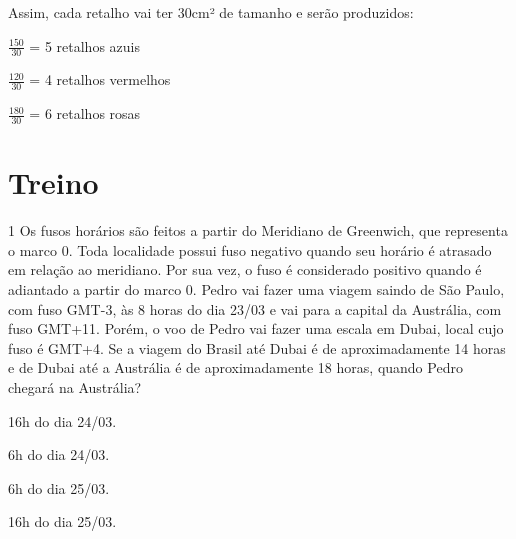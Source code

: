 Assim, cada retalho vai ter 30cm² de tamanho e serão produzidos:

$\frac{150}{30}$ = 5 retalhos azuis

$\frac{120}{30}$ = 4 retalhos vermelhos

$\frac{180}{30}$ = 6 retalhos rosas \hfill

\section{Treino}

\num{1} Os fusos horários são feitos a partir do Meridiano de Greenwich, que
representa o marco 0. Toda localidade possui fuso negativo quando seu
horário é atrasado em relação ao meridiano. Por sua vez, o fuso é
considerado positivo quando é adiantado a partir do marco 0. Pedro vai
fazer uma viagem saindo de São Paulo, com fuso GMT-3, às 8 horas do dia
23/03 e vai para a capital da Austrália, com fuso GMT+11. Porém, o voo
de Pedro vai fazer uma escala em Dubai, local cujo fuso é GMT+4. Se a
viagem do Brasil até Dubai é de aproximadamente 14 horas e de Dubai até
a Austrália é de aproximadamente 18 horas, quando Pedro chegará na
Austrália?

\begin{escolha}

    \item 16h do dia 24/03.

    \item 6h do dia 24/03.

    \item 6h do dia 25/03.

    \item 16h do dia 25/03.

\end{escolha}



